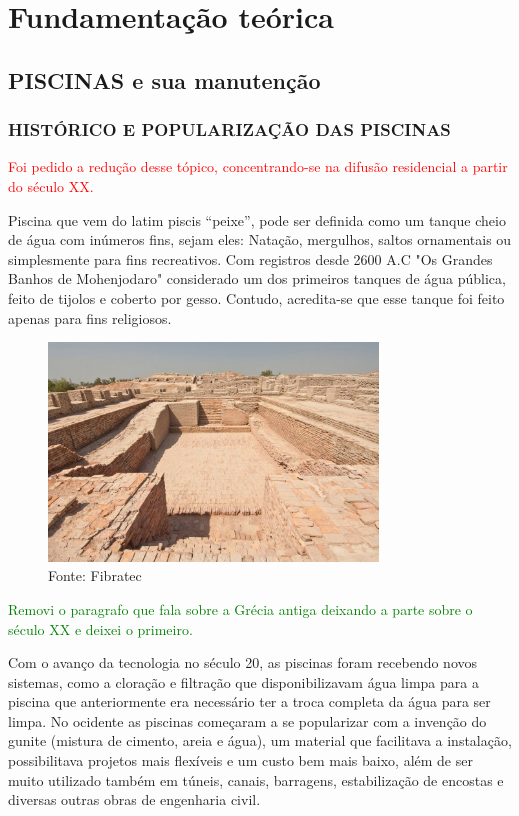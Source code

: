 \chapter{Fundamentação teórica}

\section{PISCINAS e sua manutenção}

    \subsection{HISTÓRICO E POPULARIZAÇÃO DAS PISCINAS}

        \textcolor{red}{Foi pedido a redução desse tópico, concentrando-se na difusão residencial a partir do século XX.}
    
        Piscina que vem do latim piscis “peixe”, pode ser definida como um tanque cheio de água com inúmeros fins, sejam eles: Natação, mergulhos, saltos ornamentais ou simplesmente para fins recreativos\cite{piscinaOquee}. Com registros desde 2600 A.C "Os Grandes Banhos de Mohenjodaro" considerado um dos primeiros tanques de água pública, feito de tijolos e coberto por gesso. Contudo, acredita-se que esse tanque foi feito apenas para fins religiosos.
         \begin{figure}[H]
         	\centering
         	\caption{ }  
        	\centering
         	\label{fig:cont}
        	\includegraphics[width=0.78\textwidth]{imagens/primeiraPiscina.png}
        	\caption*{Fonte: Fibratec}
         \end{figure}

         \textcolor{green}{Removi o paragrafo que fala sobre a Grécia antiga deixando a parte sobre o século XX e deixei o primeiro.}
        
        Com o avanço da tecnologia no século 20, as piscinas foram recebendo novos sistemas, como a cloração e filtração que disponibilizavam água limpa para a piscina que anteriormente era necessário ter a troca completa da água para ser limpa. No ocidente as piscinas começaram a se popularizar com a invenção do gunite (mistura de cimento, areia e água), um material que facilitava a instalação, possibilitava projetos mais flexíveis e um custo bem mais baixo, além de ser muito utilizado também em túneis, canais, barragens, estabilização de encostas e diversas outras obras de engenharia civil\cite{piscinaHistoria}.


